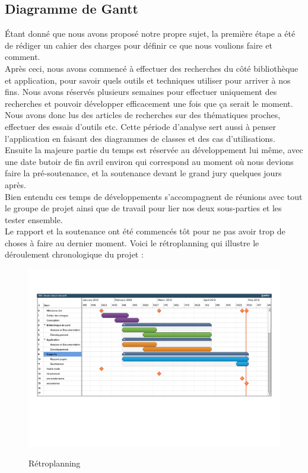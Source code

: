 \documentclass{report}
\begin{document}
			\subsection{Diagramme de Gantt}
			Étant donné que nous avons proposé notre propre sujet, la première étape a été de rédiger un cahier des charges pour définir ce que nous voulions faire et comment. \\
			Après ceci, nous avons commencé à effectuer des recherches du côté bibliothèque et application, pour savoir quels outils et techniques utiliser pour arriver à nos fins. 
			Nous avons réservés plusieurs semaines pour effectuer uniquement des recherches et pouvoir développer efficacement une fois que ça serait le moment. Nous avons donc lus des articles de recherches sur des thématiques proches, effectuer des essais d'outils etc. Cette période d'analyse sert aussi à penser l'application en faisant des diagrammes de classes et des cas d'utilisations. \\
			
			Ensuite la majeure partie du temps est réservée au développement lui même, avec une date butoir de fin avril environ qui correspond au moment où nous devions faire la pré-soutenance, et la soutenance devant le grand jury quelques jours après. \\  
			Bien entendu ces temps de développements s'accompagnent de réunions avec tout le groupe de projet ainsi que de travail pour lier nos deux sous-parties et les tester ensemble. \\
			Le rapport et la soutenance ont été commencés tôt pour ne pas avoir trop de choses à faire au dernier moment. Voici le rétroplanning qui illustre le déroulement chronologique du projet : \\
				\begin{figure}[!h]
					\centering
					\includegraphics[scale=0.6]{../soutenance/retro-planning.pdf}\\
					\caption{Rétroplanning}
					\label{Rétroplanning}
				\end{figure}
		\newpage
\end{document}
